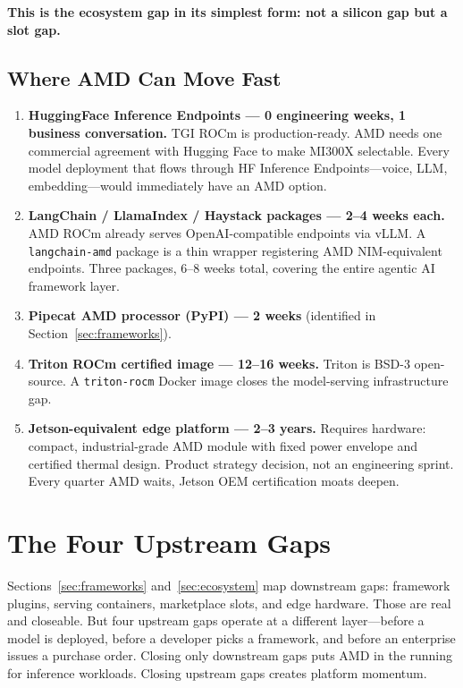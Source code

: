 \documentclass[12pt,a4paper]{article}
\begin{document}
\textbf{This is the ecosystem gap in its simplest form: not a silicon gap
but a slot gap.}

\subsection{Where AMD Can Move Fast}

\begin{enumerate}[noitemsep]
  \item \textbf{HuggingFace Inference Endpoints --- 0 engineering weeks, 1 business conversation.}  TGI ROCm is production-ready.  AMD needs one commercial agreement with Hugging Face to make MI300X selectable.  Every model deployment that flows through HF Inference Endpoints---voice, LLM, embedding---would immediately have an AMD option.

  \item \textbf{LangChain / LlamaIndex / Haystack packages --- 2--4 weeks each.}  AMD ROCm already serves OpenAI-compatible endpoints via vLLM.  A \texttt{langchain-amd} package is a thin wrapper registering AMD NIM-equivalent endpoints.  Three packages, 6--8 weeks total, covering the entire agentic AI framework layer.

  \item \textbf{Pipecat AMD processor (PyPI) --- 2 weeks} (identified in Section~\ref{sec:frameworks}).

  \item \textbf{Triton ROCm certified image --- 12--16 weeks.}  Triton is BSD-3 open-source.  A \texttt{triton-rocm} Docker image closes the model-serving infrastructure gap.

  \item \textbf{Jetson-equivalent edge platform --- 2--3 years.}  Requires hardware: compact, industrial-grade AMD module with fixed power envelope and certified thermal design.  Product strategy decision, not an engineering sprint.  Every quarter AMD waits, Jetson OEM certification moats deepen.
\end{enumerate}

\section{The Four Upstream Gaps}
\label{sec:upstream}

Sections~\ref{sec:frameworks} and~\ref{sec:ecosystem} map downstream gaps:
framework plugins, serving containers, marketplace slots, and edge hardware.
Those are real and closeable.  But four upstream gaps operate at a different
layer---before a model is deployed, before a developer picks a framework,
and before an enterprise issues a purchase order.  Closing only downstream
gaps puts AMD in the running for inference workloads.  Closing upstream gaps
creates platform momentum.
\end{document}
